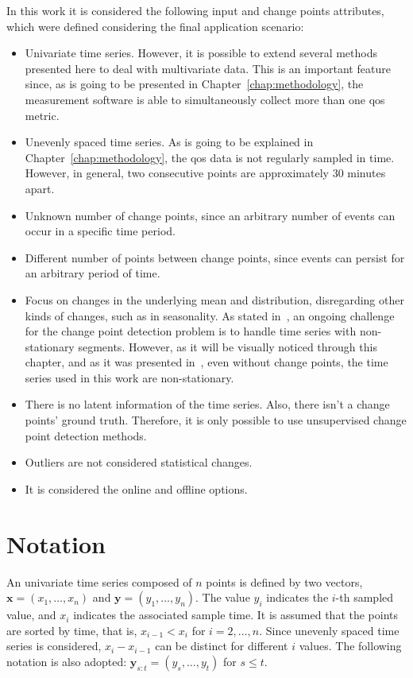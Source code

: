In this work it is considered the following input and change points attributes,
which were defined considering the final application scenario:
\begin{itemize}
\item Univariate time series. However, it is possible to extend several
methods presented here to deal with multivariate data. This is an important
feature since, as is going to be presented in
Chapter~\ref{chap:methodology}, the measurement software is able to
simultaneously collect more than one \gls*{qos} metric.
\item Unevenly spaced time series. As is going to be explained in
Chapter~\ref{chap:methodology}, the \gls*{qos} data is not regularly sampled
in time. However, in general, two consecutive points are approximately
30 minutes apart.
\item Unknown number of change points, since an arbitrary number of events can
occur in a specific time period.
\item Different number of points between change points, since events can persist
for an arbitrary period of time.
\item Focus on changes in the underlying mean and distribution, disregarding
other kinds of changes, such as in seasonality.
As stated in~\cite{a_survey_of_methods_for_time_series_change_point_detection},
an ongoing challenge for the change point detection problem is to handle
time series with non-stationary segments.
However, as it will be visually noticed through this chapter, and as it was
presented
in~\cite{a_preliminary_performance_measurement_study_of_residential_broadband_services_in_brazil},
even without change points, the time series used in this work
are non-stationary.
\item There is no latent information of the time series.
Also, there isn't a change points' ground truth.
Therefore, it is only possible to use unsupervised change point detection
methods.
\item Outliers are not considered statistical changes.
\item It is considered the online and offline options.
\end{itemize}

\section{Notation}

An univariate time series composed of $n$ points is defined by two vectors,
$\mathbf{x} = (x_{1}, \ldots, x_{n})$ and $\mathbf{y} = (y_{1}, \ldots, y_{n})$.
The value $y_{i}$ indicates the $i$-th sampled value, and $x_{i}$ indicates the
associated sample time. It is assumed that the points are sorted by time, that
is, $x_{i - 1} < x_{i}$ for $i = 2, \ldots, n$. Since unevenly spaced time
series is considered, $x_{i} - x_{i - 1}$ can be distinct for different $i$
values.
The following notation is also adopted:
$\mathbf{y}_{s:t} = (y_{s}, \ldots, y_{t})$ for $s \le t$.

